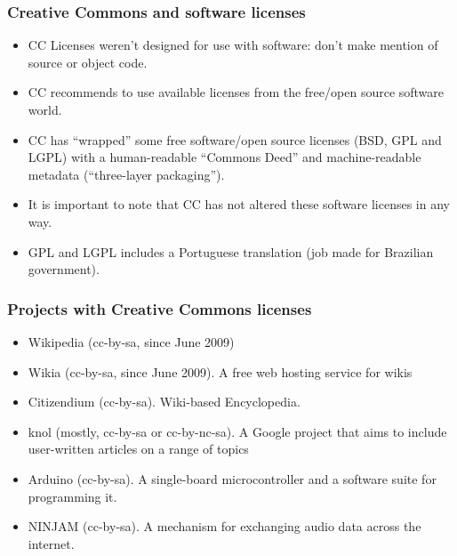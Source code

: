 \begin{frame}
\frametitle{Creative Commons and software licenses}

\begin{itemize}
\item CC Licenses weren't designed for use with software: don't make mention of source or object code.
\item CC recommends to use available licenses from the free/open source software world.
\item CC has ``wrapped'' some free software/open source licenses (BSD, GPL and LGPL) with a human-readable ``Commons Deed'' and machine-readable metadata (``three-layer packaging'').
\item It is important to note that CC has not altered these software licenses in any way.
\item GPL and LGPL includes a Portuguese translation (job made for Brazilian government).
\end{itemize}                                                 

\end{frame}


\begin{frame}
\frametitle{Projects with Creative Commons licenses}

\begin{itemize}
\item \alert{Wikipedia} (cc-by-sa, since June 2009)
\item \alert{Wikia} (cc-by-sa, since June 2009). A free web hosting service for wikis
\item \alert{Citizendium} (cc-by-sa). Wiki-based Encyclopedia.
\item \alert{knol} (mostly, cc-by-sa or cc-by-nc-sa). A Google project that aims to include user-written articles on a range of topics
\item \alert{Arduino} (cc-by-sa). A single-board microcontroller and a software suite for programming it. 
\item \alert{NINJAM} (cc-by-sa). A mechanism for exchanging audio data across the internet.
\end{itemize}                                                 

\end{frame}



